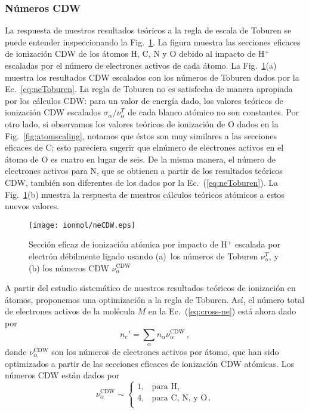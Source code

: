 \subsubsection{Números CDW}
\label{subsec:CDW}

La respuesta de nuestros resultados teóricos a la regla de escala de 
Toburen se puede entender inspeccionando la Fig.~\ref{fig:neCDW}. La 
figura muestra las secciones eficaces de ionización CDW de los átomos H, 
C, N y O debido al impacto de H$^+$ escaladas por el número de electrones 
activos de cada átomo. La Fig.~\ref{fig:neCDW}(a) muestra los resultados
CDW escalados con los números de Toburen dados por la 
Ec.~\ref{eq:neToburen}. La regla de Toburen no es satisfecha de manera 
apropiada por los cálculos CDW: para un valor de energía dado, los 
valores teóricos de ionización CDW escalados 
$\sigma_{\alpha}/\nu_{\alpha}^T$ de cada blanco atómico no son 
constantes. Por otro lado, si observamos los valores teóricos de 
ionización de O dados en la Fig.~\ref{fig:atomscaling}, notamos que éstos 
son muy similares a las secciones eficaces de C; esto pareciera sugerir 
que elnúmero de electrones activos en el átomo de O es cuatro en lugar de 
seis. De la misma manera, el número de electrones activos para N, que se 
obtienen a partir de los resultados teóricos CDW, también son diferentes 
de los dados por la Ec.~(\ref{eq:neToburen}). La Fig.~\ref{fig:neCDW}(b) 
muestra la respuesta de nuestros cálculos teóricos atómicos a estos 
nuevos valores.

\begin{figure}[t]
\centering
\texttt{[image: ionmol/neCDW.eps]}
\caption[Sección eficaz de ionización atómica escalada por $n_e$.]
{Sección eficaz de ionización atómica por impacto de H$^+$ escalada por 
electrón débilmente ligado usando (a)~los números de Toburen 
$\nu_{\alpha}^T$, y (b) los números CDW $\nu_{\alpha}^{\text{CDW}}$ }
\label{fig:neCDW}
\end{figure}

A partir del estudio sistemático de nuestros resultados teóricos de 
ionización en átomos, proponemos una optimización a la regla de Toburen. 
Así, el número total de electrones activos de la molécula $M$ en la 
Ec.~(\ref{eq:cross-ne}) está ahora dado por 
\begin{equation}
n_e'=\sum_{\alpha}n_{\alpha}\nu_{\alpha}^{\text{CDW}}\,,
\end{equation}
donde $\nu_{\alpha}^{\text{CDW}}$ son los números de electrones activos 
por átomo, que han sido optimizados a partir de las secciones eficaces 
de ionización CDW atómicas. Los números CDW están dados por
\begin{equation}
\nu_{\alpha }^{\text{CDW}} \sim\left\{ 
\begin{array}{ll}
1, & \text{para H,} \\
4, & \text{para C, N, y O}\,. \\ 
\end{array}
\right. 
\label{eq:neCDW}
\end{equation}

